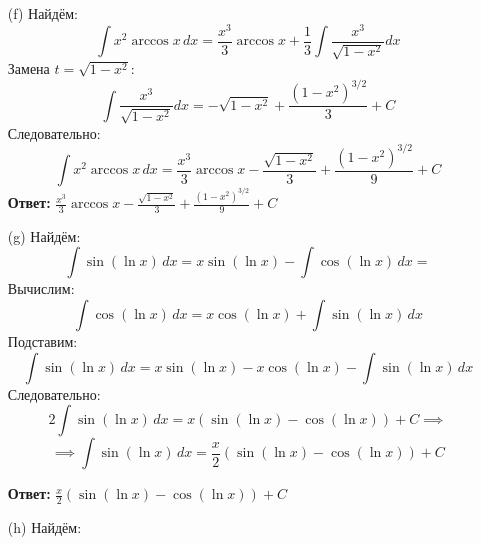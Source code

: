 \documentclass[a4paper]{article}
\begin{document}
\begin{enumerate}
\begin{enumerate}
        \item[(f)]Найдём:
        \[
        \int x^2 \arccos x \, dx = \frac{x^3}{3} \arccos x + \frac{1}{3} \int \frac{x^3}{\sqrt{1 - x^2}} dx
        \]
        Замена \(t = \sqrt{1 - x^2}\):
        \[
        \int \frac{x^3}{\sqrt{1 - x^2}} dx = -\sqrt{1 - x^2} + \frac{(1 - x^2)^{3/2}}{3} + C
        \]
        Следовательно:
        \[
        \int x^2 \arccos x \, dx = \frac{x^3}{3} \arccos x - \frac{\sqrt{1 - x^2}}{3} + \frac{(1 - x^2)^{3/2}}{9} + C
        \]
        \textbf{Ответ:} $\frac{x^3}{3} \arccos x - \frac{\sqrt{1 - x^2}}{3} + \frac{(1 - x^2)^{3/2}}{9} + C$\\

        \item[(g)]Найдём:
        \[
        \int \sin(\ln x) \, dx = x \sin(\ln x) - \int \cos(\ln x) \, dx = 
        \]
        Вычислим:
        \[
        \int \cos(\ln x) \, dx = x \cos(\ln x) + \int \sin(\ln x) \, dx
        \]
        Подставим:
        \[
            \int \sin(\ln x) \, dx = x \sin(\ln x) - x \cos(\ln x) - \int \sin(\ln x) \, dx
        \]
        Следовательно:
        $$2\int \sin(\ln x) \, dx = x (\sin(\ln x) - \cos(\ln x)) + C\implies$$
        $$ \implies \int \sin(\ln x) \, dx = \frac{x}{2} \left( \sin(\ln x) - \cos(\ln x) \right) + C$$
    
        \textbf{Ответ: } $\frac{x}{2} \left( \sin(\ln x) - \cos(\ln x) \right) + C$\\

        \item[(h)]Найдём:
    \end{enumerate}
\end{enumerate}
\end{document}
